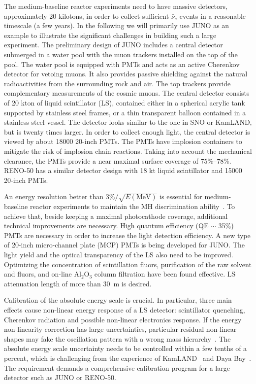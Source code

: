 \documentclass[aps,twocolumn,preprintnumbers,amsmath,superscriptaddress,amssymb,floats,nofootinbib]{revtex4-1}
\begin{document}
The medium-baseline reactor experiments need to have massive detectors, approximately 20 kilotons, in order to collect sufficient $\bar\nu_e$ events in a reasonable timescale (a few years).
In the following we will primarily use JUNO as an example to illustrate the significant challenges in building such a large experiment. 
The preliminary design of JUNO includes a central detector submerged in a water pool with the muon trackers installed on the top of the pool. 
The water pool is equipped with PMTs and acts as an active Cherenkov detector for vetoing muons.
It also provides passive shielding against the natural radioactivities from the surrounding rock and air. 
The top trackers provide complementary measurements of the cosmic muons. 
The central detector consists of 20 kton of liquid scintillator (LS), contained either in a spherical acrylic tank supported by stainless steel frames, or a thin transparent balloon contained in a stainless steel vessel. 
The detector looks similar to the one in SNO or KamLAND, but is twenty times larger. 
In order to collect enough light, the central detector is viewed by about 18000 20-inch PMTs.
The PMTs have implosion containers to mitigate the risk of implosion chain reactions. Taking into account the mechanical clearance, the PMTs provide a near maximal surface coverage of 75\%--78\%. RENO-50 has a similar detector design with 18 kt liquid scintillator and 15000 20-inch PMTs.
 
An energy resolution better than $3\%/\sqrt{E(\textrm{MeV})}$ is essential for medium-baseline reactor experiments to maintain the MH discrimination ability~\cite{Li-PRD13}. 
To achieve that, beside keeping a maximal photocathode coverage, additional technical improvements are necessary.
High quantum efficiency (QE $\sim$ 35\%) PMTs are necessary in order to increase the light detection efficiency. A new type of 20-inch micro-channel plate (MCP) PMTs is being developed for JUNO. The light yield and the optical transparency of the LS also need to be improved. Optimizing the concentration of scintillation fluors, purification of the raw solvent and fluors, and on-line Al$_2$O$_3$ column filtration have been found effective. LS attenuation length of more than 30~m is desired.

Calibration of the absolute energy scale is crucial. 
In particular, three main effects cause non-linear energy response of a LS detector: scintillator quenching, Cherenkov radiation and possible non-linear electronics response. 
If the energy non-linearity correction has large uncertainties, particular residual non-linear shapes may fake the oscillation pattern with a wrong mass hierarchy~\cite{Qian-PRD13}. 
The absolute energy scale uncertainty needs to be controlled within a few tenths of a percent, which is challenging from the experience of KamLAND~\cite{KamLAND-4pi} and Daya Bay~\cite{Zhang-Neutrino14}. The requirement demands a comprehensive calibration program for a large detector such as JUNO or RENO-50.
\end{document}
